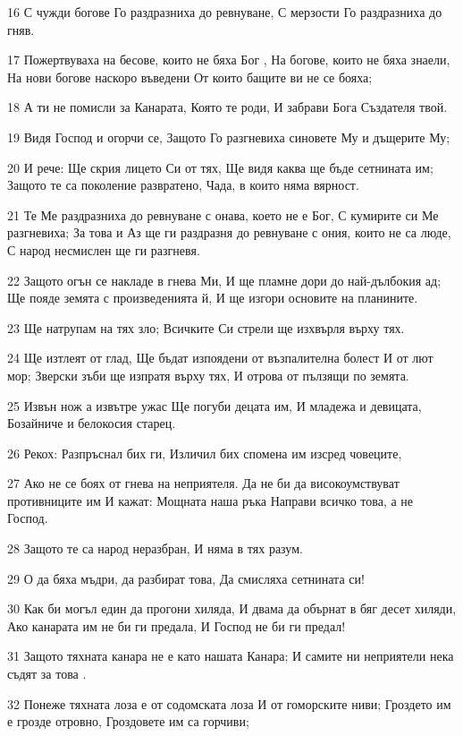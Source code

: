\par 16 С чужди богове Го раздразниха до ревнуване, С мерзости Го раздразниха до гняв.
\par 17 Пожертвуваха на бесове, които не бяха Бог , На богове, които не бяха знаели, На нови богове наскоро въведени От които бащите ви не се бояха;
\par 18 А ти не помисли за Канарата, Която те роди, И забрави Бога Създателя твой.
\par 19 Видя Господ и огорчи се, Защото Го разгневиха синовете Му и дъщерите Му;
\par 20 И рече: Ще скрия лицето Си от тях, Ще видя каква ще бъде сетнината им; Защото те са поколение развратено, Чада, в които няма вярност.
\par 21 Те Ме раздразниха до ревнуване с онава, което не е Бог, С кумирите си Ме разгневиха; За това и Аз ще ги раздразня до ревнуване с ония, които не са люде, С народ несмислен ще ги разгневя.
\par 22 Защото огън се накладе в гнева Ми, И ще пламне дори до най-дълбокия ад; Ще пояде земята с произведенията й, И ще изгори основите на планините.
\par 23 Ще натрупам на тях зло; Всичките Си стрели ще изхвърля върху тях.
\par 24 Ще изтлеят от глад, Ще бъдат изпоядени от възпалителна болест И от лют мор; Зверски зъби ще изпратя върху тях, И отрова от пълзящи по земята.
\par 25 Извън нож а извътре ужас Ще погуби децата им, И младежа и девицата, Бозайниче и белокосия старец.
\par 26 Рекох: Разпръснал бих ги, Изличил бих спомена им изсред човеците,
\par 27 Ако не се боях от гнева на неприятеля. Да не би да високоумствуват противниците им И кажат: Мощната наша ръка Направи всичко това, а не Господ.
\par 28 Защото те са народ неразбран, И няма в тях разум.
\par 29 О да бяха мъдри, да разбират това, Да смисляха сетнината си!
\par 30 Как би могъл един да прогони хиляда, И двама да обърнат в бяг десет хиляди, Ако канарата им не би ги предала, И Господ не би ги предал!
\par 31 Защото тяхната канара не е като нашата Канара; И самите ни неприятели нека съдят за това .
\par 32 Понеже тяхната лоза е от содомската лоза И от гоморските ниви; Гроздето им е грозде отровно, Гроздовете им са горчиви;
